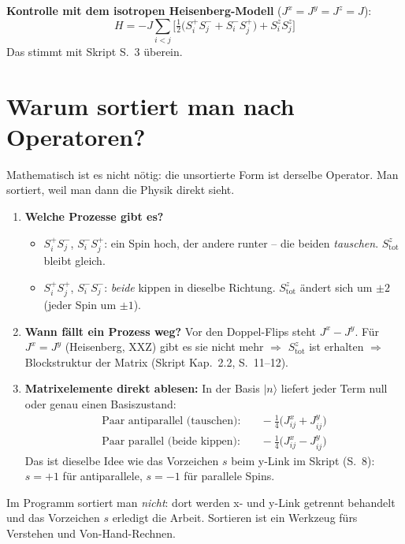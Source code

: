 \documentclass[11pt,a4paper]{article}
\newcommand{\ket}[1]{\lvert #1\rangle}
\begin{document}
\textbf{Kontrolle mit dem isotropen Heisenberg-Modell} ($J^x=J^y=J^z=J$):
\[
H = -J\sum_{i<j}\Big[\tfrac12\big(S^+_iS^-_j + S^-_iS^+_j\big) + S^z_iS^z_j\Big]
\]
Das stimmt mit Skript S.~3 überein.

\section{Warum sortiert man nach Operatoren?}

Mathematisch ist es nicht nötig: die unsortierte Form ist derselbe Operator. Man sortiert, weil man dann die Physik direkt sieht.

\begin{warum}
\begin{enumerate}[leftmargin=*,itemsep=3pt]
\item \textbf{Welche Prozesse gibt es?}
  \begin{itemize}
  \item $S^+_iS^-_j$, $S^-_iS^+_j$: ein Spin hoch, der andere runter -- die beiden \emph{tauschen}. $S^z_\text{tot}$ bleibt gleich.
  \item $S^+_iS^+_j$, $S^-_iS^-_j$: \emph{beide} kippen in dieselbe Richtung. $S^z_\text{tot}$ ändert sich um $\pm2$ (jeder Spin um $\pm1$).
  \end{itemize}
\item \textbf{Wann fällt ein Prozess weg?} Vor den Doppel-Flips steht $J^x - J^y$. Für $J^x = J^y$ (Heisenberg, XXZ) gibt es sie nicht mehr $\Rightarrow$ $S^z_\text{tot}$ ist erhalten $\Rightarrow$ Blockstruktur der Matrix (Skript Kap.~2.2, S.~11--12).
\item \textbf{Matrixelemente direkt ablesen:} In der Basis $\ket n$ liefert jeder Term null oder genau einen Basiszustand:
\begin{align*}
\text{Paar antiparallel (tauschen):}&\quad -\tfrac14\big(J^x_{ij} + J^y_{ij}\big)\\
\text{Paar parallel (beide kippen):}&\quad -\tfrac14\big(J^x_{ij} - J^y_{ij}\big)
\end{align*}
Das ist dieselbe Idee wie das Vorzeichen $s$ beim y-Link im Skript (S.~8): $s=+1$ für antiparallele, $s=-1$ für parallele Spins.
\end{enumerate}
\end{warum}

Im Programm sortiert man \emph{nicht}: dort werden x- und y-Link getrennt behandelt und das Vorzeichen $s$ erledigt die Arbeit. Sortieren ist ein Werkzeug fürs Verstehen und Von-Hand-Rechnen.
\end{document}
